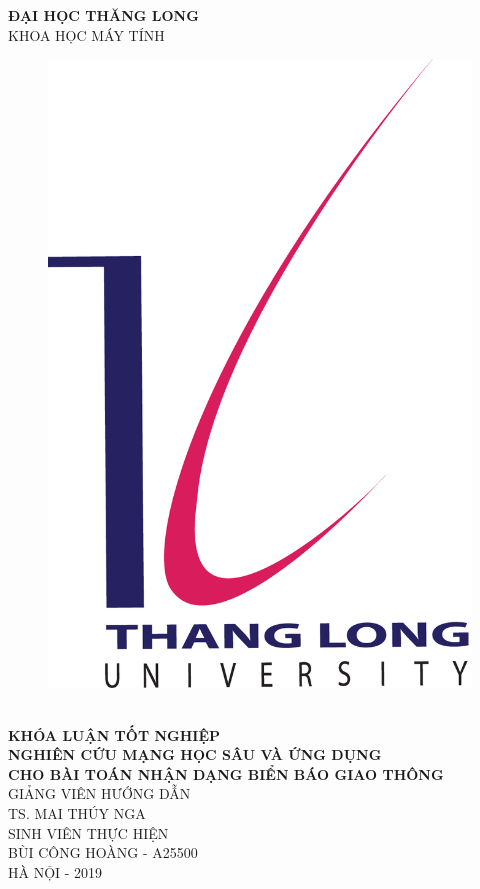 \begin{titlepage}
\begin{center}
\textbf{ĐẠI HỌC THĂNG LONG}\\
{KHOA HỌC MÁY TÍNH} 
\vspace{30mm}
\begin{figure}[htp]
\begin{center}
\includegraphics[scale=1]{coverpage/image/Logo_Thanglong}
\end{center}
\end{figure}\\
\textbf{\large KHÓA LUẬN TỐT NGHIỆP}\\
[0.75cm]
\textbf{\large NGHIÊN CỨU MẠNG HỌC SÂU VÀ ỨNG DỤNG\\CHO BÀI TOÁN NHẬN DẠNG BIỂN BÁO GIAO THÔNG }\\
\vspace{4cm}
GIẢNG VIÊN HƯỚNG DẪN\\
[3mm]
{\large TS. MAI THÚY NGA}\\
[1cm]
SINH VIÊN THỰC HIỆN\\
[3mm]
\textsc{\large BÙI CÔNG HOÀNG - A25500} \\
[4cm]
HÀ NỘI - 2019
\end{center}
\end{titlepage}
